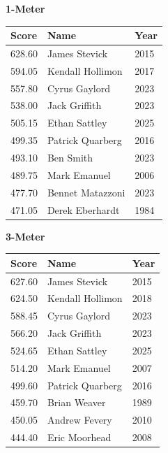 \vspace{1.2em}
\noindent\begin{minipage}[t]{0.48\textwidth}
\centering
\textbf{\textcolor{teamprimary}{1-Meter}}\par
\vspace{0.5em}
\centering
\small
\renewcommand{\arraystretch}{1.0}
\setlength{\tabcolsep}{4pt}
\begin{tabular}{@{}p{1.8cm}p{3.0cm}p{1.0cm}@{}}
\toprule
\textbf{Score} & \textbf{Name} & \textbf{Year} \\
\midrule
628.60 & James Stevick & 2015 \\
594.05 & Kendall Hollimon & 2017 \\
557.80 & Cyrus Gaylord & 2023 \\
538.00 & Jack Griffith & 2023 \\
505.15 & Ethan Sattley & 2025 \\
499.35 & Patrick Quarberg & 2016 \\
493.10 & Ben Smith & 2023 \\
489.75 & Mark Emanuel & 2006 \\
477.70 & Bennet Matazzoni & 2023 \\
471.05 & Derek Eberhardt & 1984 \\
\bottomrule
\end{tabular}
\end{minipage}
\hfill
\begin{minipage}[t]{0.48\textwidth}
\centering
\textbf{\textcolor{teamprimary}{3-Meter}}\par
\vspace{0.5em}
\centering
\small
\renewcommand{\arraystretch}{1.0}
\setlength{\tabcolsep}{4pt}
\begin{tabular}{@{}p{1.8cm}p{3.0cm}p{1.0cm}@{}}
\toprule
\textbf{Score} & \textbf{Name} & \textbf{Year} \\
\midrule
627.60 & James Stevick & 2015 \\
624.50 & Kendall Hollimon & 2018 \\
588.45 & Cyrus Gaylord & 2023 \\
566.20 & Jack Griffith & 2023 \\
524.65 & Ethan Sattley & 2025 \\
514.20 & Mark Emanuel & 2007 \\
499.60 & Patrick Quarberg & 2016 \\
459.70 & Brian Weaver & 1989 \\
450.05 & Andrew Fevery & 2010 \\
444.40 & Eric Moorhead & 2008 \\
\bottomrule
\end{tabular}
\end{minipage}
